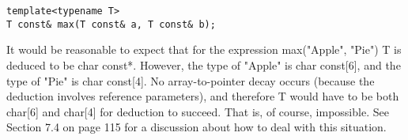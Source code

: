\begin{lstlisting}[style=styleCXX]
template<typename T>
T const& max(T const& a, T const& b);
\end{lstlisting} 

It would be reasonable to expect that for the expression max("Apple", "Pie") T is deduced to be char const*. However, the type of "Apple" is char const[6], and the type of "Pie" is char const[4]. No array-to-pointer decay occurs (because the deduction involves reference parameters), and therefore T would have to be both char[6] and char[4] for deduction to succeed. That is, of course, impossible. See Section 7.4 on page 115 for a discussion about how to deal with this situation.























 